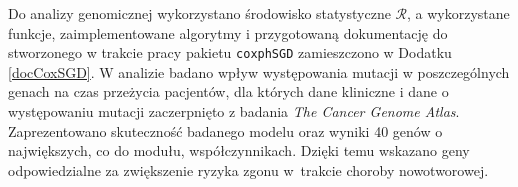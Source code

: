 Do analizy genomicznej wykorzystano środowisko statystyczne $\mathcal{R}$, a wykorzystane funkcje, zaimplementowane algorytmy i przygotowaną dokumentację do stworzonego w trakcie pracy pakietu \texttt{coxphSGD} zamieszczono w Dodatku \ref{docCoxSGD}. W analizie badano wpływ występowania mutacji w poszczególnych genach na czas przeżycia pacjentów, dla których dane kliniczne i dane o występowaniu mutacji zaczerpnięto z badania \textit{The Cancer Genome Atlas}. Zaprezentowano skuteczność badanego modelu oraz wyniki 40 genów o największych, co do modułu, współczynnikach. Dzięki temu wskazano geny odpowiedzialne za zwiększenie ryzyka zgonu w~trakcie choroby nowotworowej.